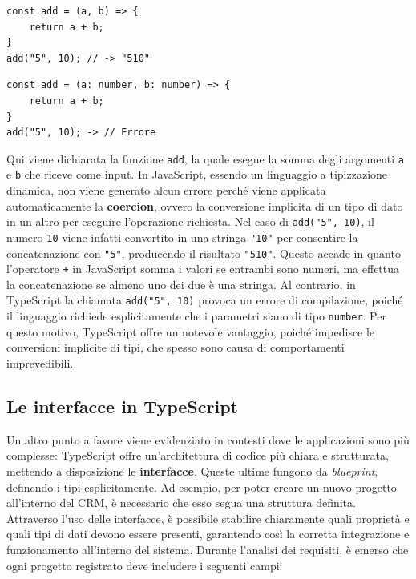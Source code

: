 \documentclass[target=bach,aauheader=,style=]{thud}
\begin{document}
\begin{minipage}[t]{0.45\textwidth}
    \begin{lstlisting}[caption=Coercion in JavaScript]
const add = (a, b) => {
    return a + b;
}   
add("5", 10); // -> "510"
    \end{lstlisting}
\end{minipage}
\hfill
\begin{minipage}[t]{0.45\textwidth}
    \begin{lstlisting}[caption=Errore in TypeScript]
const add = (a: number, b: number) => {
    return a + b;
}  
add("5", 10); -> // Errore
    \end{lstlisting}
\end{minipage}

\noindent Qui viene dichiarata la funzione \texttt{add}, la quale esegue la somma degli argomenti \texttt{a} e \texttt{b} che riceve come input. In JavaScript, essendo un linguaggio a tipizzazione dinamica, non viene generato alcun errore perché viene applicata automaticamente la \textbf{coercion}, ovvero la conversione implicita di un tipo di dato in un altro per eseguire l'operazione richiesta. Nel caso di \texttt{add("5", 10)}, il numero \texttt{10} viene infatti convertito in una stringa \texttt{"10"} per consentire la concatenazione con \texttt{"5"}, producendo il risultato \texttt{"510"}. Questo accade in quanto l'operatore \texttt{+} in JavaScript somma i valori se entrambi sono numeri, ma effettua la concatenazione se almeno uno dei due è una stringa. Al contrario, in TypeScript la chiamata \texttt{add("5", 10)} provoca un errore di compilazione, poiché il linguaggio richiede esplicitamente che i parametri siano di tipo \texttt{number}. Per questo motivo, TypeScript offre un notevole vantaggio, poiché impedisce le conversioni implicite di tipi, che spesso sono causa di comportamenti imprevedibili.

\subsection{Le interfacce in TypeScript}
\noindent Un altro punto a favore viene evidenziato in contesti dove le applicazioni sono più complesse: TypeScript offre un'architettura di codice più chiara e strutturata, mettendo a disposizione le \textbf{interfacce}. Queste ultime fungono da \textit{blueprint}, definendo i tipi esplicitamente. Ad esempio, per poter creare un nuovo progetto all'interno del CRM, è necessario che esso segua una struttura definita. Attraverso l'uso delle interfacce, è possibile stabilire chiaramente quali proprietà e quali tipi di dati devono essere presenti, garantendo così la corretta integrazione e funzionamento all'interno del sistema. Durante l'analisi dei requisiti, è emerso che ogni progetto registrato deve includere i seguenti campi:
\end{document}
